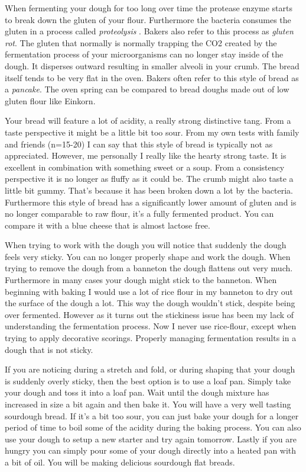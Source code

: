 When fermenting your dough for too long over time the protease enzyme starts to
break down the gluten of your flour. Furthermore the bacteria consumes the gluten
in a process called {\it proteolysis} \cite{raffaella+di+cagno}.
Bakers also refer to this process as {\it gluten rot}.
The gluten that normally is normally trapping the CO2 created
by the fermentation process of your microorganisms can no longer stay inside of
the dough. It disperses outward resulting in smaller alveoli in your crumb.
The bread itself tends to be very flat in the oven. Bakers often refer
to this style of bread as a {\it pancake}. The oven spring can be compared
to bread doughs made out of low gluten flour like Einkorn.

Your bread will feature a lot of acidity, a really strong distinctive tang. From
a taste perspective it might be a little bit too sour. From my own tests with family and
friends (n=15-20) I can say that this style of bread is typically
not as appreciated. However, me personally I really like the hearty strong taste.
It is excellent in combination with something
sweet or a soup.  From a consistency perspective it is no longer as fluffy as it could be.
The crumb might also taste a little bit gummy. That's because it has been broken down a lot
by the bacteria. Furthermore this style of bread has a significantly lower amount of gluten \cite{raffaella+di+cagno}
and is no longer comparable to raw flour, it's a fully fermented product.
You can compare it with a blue cheese that is almost lactose free.

When trying to work with the dough you will notice that suddenly the dough feels
very sticky. You can no longer properly shape and work the dough. When trying to
remove the dough from a banneton the dough flattens out very much. Furthermore
in many cases your dough might stick to the banneton. When beginning with baking
I would use a lot of rice flour in my banneton to dry out the surface of the dough a lot.
This way the dough wouldn't stick, despite being over fermented. However as it
turns out the stickiness issue has been my lack of understanding the fermentation
process. Now I never use rice-flour, except when trying to apply decorative scorings.
Properly managing fermentation results in a dough that is not sticky.

If you are noticing during a stretch and fold, or during shaping that your dough
is suddenly overly sticky, then the best option is to use a loaf pan. Simply take
your dough and toss it into a loaf pan. Wait until the dough mixture has increased
in size a bit again and then bake it. You will have a very well tasting sourdough
bread. If it's a bit too sour, you can just bake your dough for a longer period
of time to boil some of the acidity during the baking process. You can also use
your dough to setup a new starter and try again tomorrow. Lastly if you are hungry
you can simply pour some of your dough directly into a heated pan with a bit of
oil. You will be making delicious sourdough flat breads.

